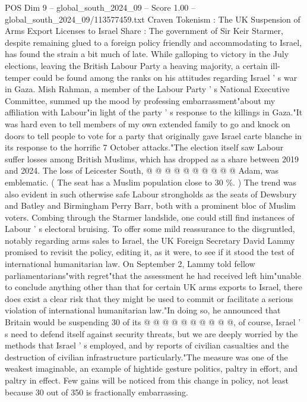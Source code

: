 \begin{textsample}{POS Dim 9 – global\_south\_2024\_09 – Score 1.00 – global\_south\_2024\_09/113577459.txt}  \label{ex:f9_pos_258}
Craven Tokenism : The UK Suspension of Arms Export Licenses to Israel Share : The government of Sir Keir Starmer, despite remaining glued to a foreign policy friendly and accommodating to Israel, has found the strain a bit much of late.
While galloping to victory in the July elections, leaving the British Labour Party a heaving majority, a certain ill-temper could be found among the ranks on his attitudes regarding Israel ' s war in Gaza.
Mish Rahman, a member of the Labour Party ' s National Executive Committee, summed up the mood by professing embarrassment"about my affiliation with Labour"in light of the party ' s response to the killings in Gaza."It was hard even to tell members of my own extended family to go and knock on doors to tell people to vote for a party that originally gave Israel carte blanche in its response to the horrific 7 October attacks."The election itself saw Labour suffer losses among British Muslims, which has dropped as a share between 2019 and 2024.
The loss of Leicester South, @ @ @ @ @ @ @ @ @ @ Adam, was emblematic. ( The seat has a Muslim population close to 30 \%. ) The trend was also evident in such otherwise safe Labour strongholds as the seats of Dewsbury and Batley and Birmingham Perry Barr, both with a prominent bloc of Muslim voters.
Combing through the Starmer landslide, one could still find instances of Labour ' s electoral bruising.
To offer some mild reassurance to the disgruntled, notably regarding arms sales to Israel, the UK Foreign Secretary David Lammy promised to revisit the policy, editing it, as it were, to see if it stood the test of international humanitarian law.
On September 2, Lammy told fellow parliamentarians"with regret"that the assessment he had received left him"unable to conclude anything other than that for certain UK arms exports to Israel, there does exist a clear risk that they might be used to commit or facilitate a serious violation of international humanitarian law."In doing so, he announced that Britain would be suspending 30 of its @ @ @ @ @ @ @ @ @ @, of course, Israel ' s need to defend itself against security threats, but we are deeply worried by the methods that Israel ' s employed, and by reports of civilian casualties and the destruction of civilian infrastructure particularly."The measure was one of the weakest imaginable, an example of hightide gesture politics, paltry in effort, and paltry in effect.
Few gains will be noticed from this change in policy, not least because 30 out of 350 is fractionally embarrassing.

\end{textsample}
